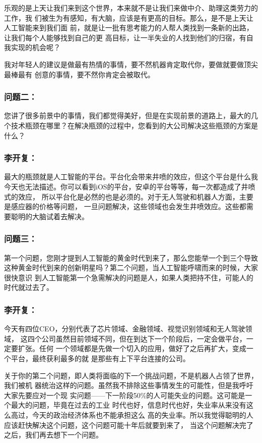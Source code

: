 \documentclass[11pt]{ctexart}
\begin{document}
{{{{乐观的是上天让我们来到这个世界，本来就不是让我们来做中介、助理这类劳力的工作，我
们被生为有感知，有大脑，应该是有更高的目标。那么，是不是上天让人工智能来到我们面
前，就是让一批有思考能力的人帮人类找到一条新的出路，让我们每个人能够找到自己的更
高目标，让一半失业的人找到他们的归宿，有自我实现的机会呢？

我对年轻人的建议是做最有热情的事情，要不然机器肯定取代你，要做就要做顶尖最棒最有
创意的事情，要不然你肯定会被取代。

\subsubsection{问题二：}
\label{sec:org259d84f}
您讲了很多前景中的事情，我们都觉得美好，但是在实现前景的道路上，最大的几
个技术瓶颈在哪里？在解决瓶颈的过程中，您看到的大公司解决这些瓶颈的方案是什么？

\subsubsection{李开复：}
\label{sec:org97880cf}
最大的瓶颈就是人工智能的平台。平台化会带来井喷的效应，但这个平台是什么我
今天也无法描述。你可以看到iOS的平台，安卓的平台等等，每一次都造成了井喷式的效应，
所以平台化是必然的也是必须的。对于无人驾驶和机器人方面，主要是感应器的价格等问题，
一旦问题解决，这些领域也会发生井喷效应。这些都需要聪明的大脑试着去解决。

\subsubsection{问题三：}
\label{sec:orga7e13ad}
第一个问题，您刚才提到人工智能的黄金时代到来了，那么您能举一个到三个导致
这种黄金时代到来的创新明星吗？第二个问题，当人工智能呼啸而来的时候，大家很快意识
到人工智能第一个急需解决的问题是人，如果人类把持不住，可能人的时代就过去了。

\subsubsection{李开复：}
\label{sec:orgb00135e}
今天有四位CEO，分别代表了芯片领域、金融领域、视觉识别领域和无人驾驶领域，
这四个公司虽然目前领域不同，但在到达下一个阶段后，一定会做平台，一定要扩张。任何
一个领域都是先做一个切入的应用，做好了之后再扩大，变成一个平台，最终获利最多的就
是那些有上下平台连接的公司。

关于你的第二个问题，即人类将面临的下一个挑战问题，不是机器人占领了世界，我们被机
器统治这样的问题。虽然我不排除这些事情发生的可能性，但是我呼吁大家先要应对一个现
实问题——下一阶段50\%的人可能失业的问题。这可能是一个最大的问题，毕竟在过去的工业
时代也好，信息时代也好，失业率从来没有这么高过，今天的政治经济体系也不能承担这么
高的失业率。所以我觉得聪明的人应该赶快解决这个问题，这个问题可能十年后就要到来了，
当这个问题解决完了之后，我们再去想下一个问题。

}}}}
\end{document}
